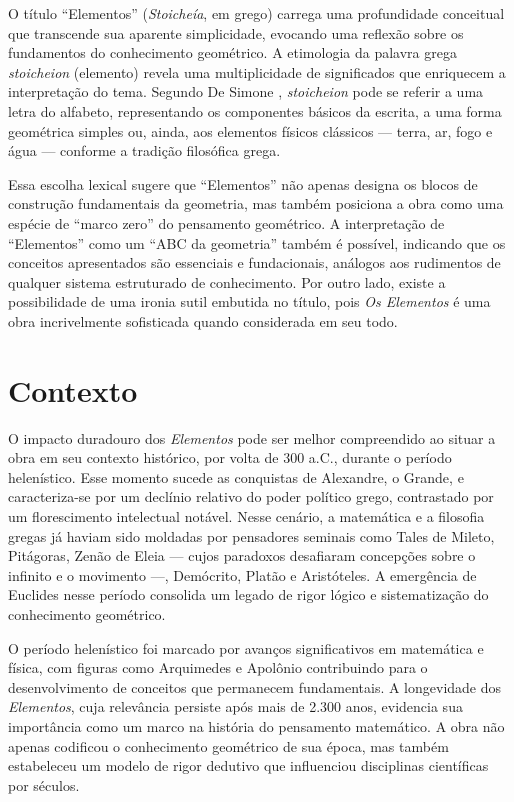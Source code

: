 \documentclass{hipatia}
\begin{document}
O título ``Elementos'' (\emph{Stoicheía}, em grego)
 carrega uma profundidade
conceitual que transcende sua aparente
simplicidade, evocando uma reflexão sobre os
fundamentos do conhecimento geométrico. A
etimologia da palavra grega \emph{stoicheion}
(elemento) revela uma multiplicidade de
significados que enriquecem a interpretação do
tema. Segundo De Simone \cite{deSimone2020},
 \emph{stoicheion} pode se referir a uma
letra do alfabeto, representando os componentes
básicos da escrita, a uma forma geométrica
simples ou, ainda, aos elementos físicos
clássicos --- terra, ar, fogo e água --- conforme
a tradição filosófica grega.

Essa escolha lexical sugere que ``Elementos'' não
apenas designa os blocos de construção
fundamentais da geometria, mas também posiciona a
obra como uma espécie de ``marco zero'' do
pensamento geométrico. A interpretação de
``Elementos'' como um ``ABC da
geometria'' também é possível, indicando que os
conceitos apresentados são essenciais e
fundacionais, análogos aos rudimentos de qualquer
sistema estruturado de conhecimento. Por outro
lado, existe a possibilidade de uma ironia sutil
embutida no título, pois \emph{Os Elementos}
é uma obra incrivelmente
sofisticada quando considerada em seu todo.


\section{Contexto}

O impacto duradouro dos \emph{Elementos} pode ser melhor
compreendido ao situar a obra em seu contexto
histórico, por volta de 300 a.C., durante o
período helenístico. Esse momento sucede
as conquistas de Alexandre, o Grande, e
caracteriza-se por um declínio relativo do poder
político grego, contrastado por um florescimento
intelectual notável. Nesse cenário, a matemática e
a filosofia gregas já haviam sido moldadas por
pensadores seminais como Tales de Mileto,
Pitágoras, Zenão de Eleia --- cujos paradoxos
desafiaram concepções sobre o infinito e o
movimento ---, Demócrito, Platão e Aristóteles. A
emergência de Euclides nesse período consolida um
legado de rigor lógico e sistematização do
conhecimento geométrico.

O período helenístico foi marcado por avanços
significativos em matemática e física, com figuras
como Arquimedes e Apolônio contribuindo para o
desenvolvimento de conceitos que permanecem
fundamentais. A longevidade dos \emph{Elementos}, cuja
relevância persiste após mais de 2.300 anos,
evidencia sua importância como um marco na
história do pensamento matemático. A obra não
apenas codificou o conhecimento geométrico de sua
época, mas também estabeleceu um modelo de rigor
dedutivo que influenciou disciplinas científicas
por séculos.
\end{document}
